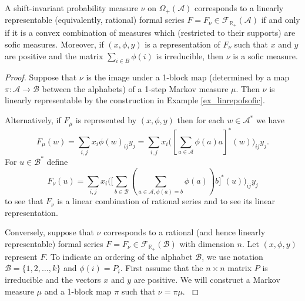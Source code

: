 \documentclass{kepart2010}
\theoremstyle{plain}
\theoremstyle{definition}
\theoremstyle{remark}
\theoremstyle{definition}
\numberwithin{equation}{section}
\begin{document}
\begin{thm}\label{rationaltheorem}
A shift-invariant probability measure $\nu$ on $\Omega_{+}({{\mathcal A}})$
corresponds to a
 linearly representable (equivalently, rational)
 formal series $F =
F_{\nu} \in \mathcal{F}_{\operatorname{\mathbb R}_{+}}({{\mathcal A}})$ if and only if it is {}{ a
convex combination of measures which (restricted to their supports)
are sofic measures. }
 {}{ Moreover,
if $(x,\phi , y)$ is a representation of $F_{\nu}$ such that $x$ and
$y$ are positive and the matrix $\sum_{i\in B}\phi (i)$ is
irreducible, then $\nu$ is a sofic measure. }
\end{thm}

\begin{proof}
 {
 Suppose that $\nu$ is the image under a 1-block map
(determined by a map $\pi : {{\mathcal A}} \rightarrow {{\mathcal B}}$ between the
alphabets) of a 1-step Markov measure $\mu$. Then $\nu$ is linearly
representable by the construction in Example \ref{ex_linrepofsofic}.
}

Alternatively, if $F_{\mu}$ is represented by $(x, \phi , y)$ then
for each $w \in {{\mathcal A}}^{*}$ we have
 \begin{equation}
F_{\mu}(w)
= \sum_{i,j}x_i \phi(w)_{ij}y_j
= \sum_{i,j}x_i \Big([\sum_{a \in {{\mathcal A}}} \phi(a)a]^{*}(w)\Big)_{ij}y_j.
 \end{equation}
 For  $u \in {\mathcal B^*}$ define
 \begin{equation}
F_{\nu} (u)
=\sum_{i,j} x_i \Bigg( \Big[ \sum_{b \in \mathcal B }
 (\sum_{a\in {{\mathcal A}},  \phi (a)=b} \phi(a))b\Big]^{*}(u)\Bigg)_{ij}y_j
\end{equation}
to see that $F_{\nu}$ is a linear combination of rational series
and to see its linear representation.

 Conversely, suppose that $\nu$ corresponds to a rational (and
hence linearly representable) formal series $F=F_{\nu} \in
\mathcal{F}_{\operatorname{\mathbb R}_{+}}(\mathcal B)$ with dimension $n$.  Let $(x,
\phi, y)$ represent $F$. {}{ To indicate an ordering of the alphabet
$\mathcal B$, we use notation $\mathcal B=\{1,2, \dots , k\}$ and
$\phi (i) = P_i$. First assume that the $n\times n$ matrix $P$ is
irreducible and the vectors $x$ and $y$ are positive. We will
construct a Markov measure $\mu$ and a 1-block map $\pi$ such that
$\nu  = \pi \mu$. }


\end{proof}
\end{document}
